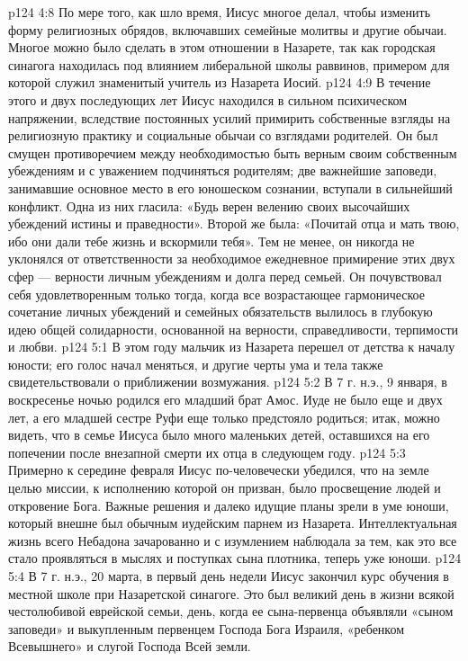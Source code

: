 \vs p124 4:8 По мере того, как шло время, Иисус многое делал, чтобы изменить форму религиозных обрядов, включавших семейные молитвы и другие обычаи. Многое можно было сделать в этом отношении в Назарете, так как городская синагога находилась под влиянием либеральной школы раввинов, примером для которой служил знаменитый учитель из Назарета Иосий.
\vs p124 4:9 В течение этого и двух последующих лет Иисус находился в сильном психическом напряжении, вследствие постоянных усилий примирить собственные взгляды на религиозную практику и социальные обычаи со взглядами родителей. Он был смущен противоречием между необходимостью быть верным своим собственным убеждениям и с уважением подчиняться родителям; две важнейшие заповеди, занимавшие основное место в его юношеском сознании, вступали в сильнейший конфликт. Одна из них гласила: «Будь верен велению своих высочайших убеждений истины и праведности». Второй же была: «Почитай отца и мать твою, ибо они дали тебе жизнь и вскормили тебя». Тем не менее, он никогда не уклонялся от ответственности за необходимое ежедневное примирение этих двух сфер --- верности личным убеждениям и долга перед семьей. Он почувствовал себя удовлетворенным только тогда, когда все возрастающее гармоническое сочетание личных убеждений и семейных обязательств вылилось в глубокую идею общей солидарности, основанной на верности, справедливости, терпимости и любви.
\vs p124 5:1 В этом году мальчик из Назарета перешел от детства к началу юности; его голос начал меняться, и другие черты ума и тела также свидетельствовали о приближении возмужания.
\vs p124 5:2 В 7 г. н.э., 9 января, в воскресенье ночью родился его младший брат Амос. Иуде не было еще и двух лет, а его младшей сестре Руфи еще только предстояло родиться; итак, можно видеть, что в семье Иисуса было много маленьких детей, оставшихся на его попечении после внезапной смерти их отца в следующем году.
\vs p124 5:3 \pc Примерно к середине февраля Иисус по\hyp{}человечески убедился, что на земле целью миссии, к исполнению которой он призван, было просвещение людей и откровение Бога. Важные решения и далеко идущие планы зрели в уме юноши, который внешне был обычным иудейским парнем из Назарета. Интеллектуальная жизнь всего Небадона зачарованно и с изумлением наблюдала за тем, как это все стало проявляться в мыслях и поступках сына плотника, теперь уже юноши.
\vs p124 5:4 \pc В 7 г. н.э., 20 марта, в первый день недели Иисус закончил курс обучения в местной школе при Назаретской синагоге. Это был великий день в жизни всякой честолюбивой еврейской семьи, день, когда ее сына\hyp{}первенца объявляли «сыном заповеди» и выкупленным первенцем Господа Бога Израиля, «ребенком Всевышнего» и слугой Господа Всей земли.

